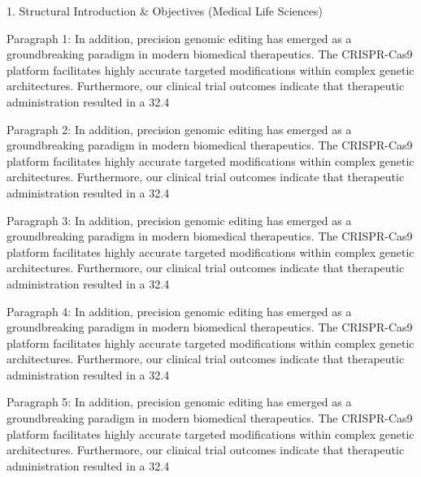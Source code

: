 1. Structural Introduction & Objectives (Medical Life Sciences)


Paragraph 1: In addition, precision genomic editing has emerged as a groundbreaking paradigm in modern biomedical therapeutics. The CRISPR-Cas9 platform facilitates highly accurate targeted modifications within complex genetic architectures. Furthermore, our clinical trial outcomes indicate that therapeutic administration resulted in a 32.4%

Paragraph 2: In addition, precision genomic editing has emerged as a groundbreaking paradigm in modern biomedical therapeutics. The CRISPR-Cas9 platform facilitates highly accurate targeted modifications within complex genetic architectures. Furthermore, our clinical trial outcomes indicate that therapeutic administration resulted in a 32.4%

Paragraph 3: In addition, precision genomic editing has emerged as a groundbreaking paradigm in modern biomedical therapeutics. The CRISPR-Cas9 platform facilitates highly accurate targeted modifications within complex genetic architectures. Furthermore, our clinical trial outcomes indicate that therapeutic administration resulted in a 32.4%

Paragraph 4: In addition, precision genomic editing has emerged as a groundbreaking paradigm in modern biomedical therapeutics. The CRISPR-Cas9 platform facilitates highly accurate targeted modifications within complex genetic architectures. Furthermore, our clinical trial outcomes indicate that therapeutic administration resulted in a 32.4%

Paragraph 5: In addition, precision genomic editing has emerged as a groundbreaking paradigm in modern biomedical therapeutics. The CRISPR-Cas9 platform facilitates highly accurate targeted modifications within complex genetic architectures. Furthermore, our clinical trial outcomes indicate that therapeutic administration resulted in a 32.4%



